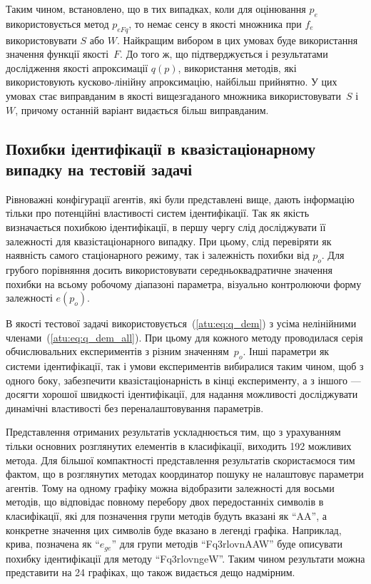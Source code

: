 Таким чином, встановлено, що в тих випадках, коли для оцінювання $p_e$ використовується
метод $p_{eFq}$, то немає сенсу в якості множника при $f_e$
використовувати $S$ або $W$. Найкращим вибором в цих умовах буде
використання значення функції якості~$F$. До того ж, що підтверджується і
результатами дослідження якості апроксимації $q(p)$, використання методів,
які використовують кусково-лінійну апроксимацію, найбільш прийнятно. У цих
умовах стає виправданим в якості вищезгаданого множника використовувати~$S$
і~$W$, причому останній варіант видається більш виправданим.


\subsection{Похибки ідентифікації в квазістаціонарному випадку на тестовій задачі} %

Рівноважні конфігурації агентів, які були представлені вище, дають інформацію тільки про
потенційні властивості систем ідентифікації.
Так як якість визначається похибкою ідентифікації,
в першу чергу слід досліджувати її залежності для
квазістаціонарного випадку.
При цьому, слід перевіряти як наявність самого стаціонарного
режиму, так і залежність похибки від
$p_o$. Для грубого порівняння досить використовувати
середньоквадратичне значення похибки на всьому робочому
діапазоні параметра, візуально контролюючи форму залежності
$e(p_o)$.

В якості тестової задачі
використовується~(\ref{atu:eq:q_dem}) з усіма нелінійними членами~(\ref{atu:eq:q_dem_all}).
При цьому для кожного методу
проводилася серія обчислювальних експериментів з різним значенням~$p_o$. Інші
параметри як системи ідентифікації, так і умови експериментів вибиралися таким
чином, щоб з одного боку, забезпечити квазістаціонарність в кінці експерименту, а
з іншого --- досягти хорошої швидкості ідентифікації, для надання можливості
досліджувати динамічні властивості без переналаштовування параметрів.

Представлення отриманих результатів ускладнюється тим, що з урахуванням тільки
основних розглянутих елементів в класифікації, виходить 192 можливих метода.
Для більшої компактності представлення результатів
скористаємося тим фактом, що в розглянутих методах координатор
пошуку не налаштовує параметри агентів.
Тому на одному графіку можна відобразити залежності для восьми методів,
що відповідає повному перебору двох передостанніх символів в
класифікації, які для позначення групи методів будуть вказані як
``AA'', а конкретне значення цих символів буде вказано в легенді
графіка. Наприклад, крива, позначена як ``$e_{ge}$'' для групи
методів ``Fq3rlovnAAW'' буде описувати похибку ідентифікації для
методу ``Fq3rlovngeW''. Таким чином результати можна представити на
24 графіках, що також видається дещо надмірним.

